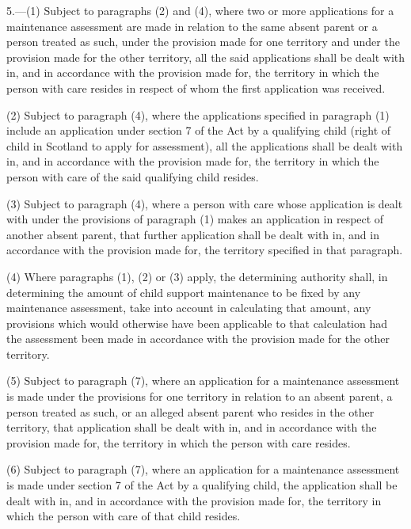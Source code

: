 \documentclass[12pt,a4paper]{article}
\begin{document}
\renewcommand\parthead{--- Schedule 1 Part II}

5.—(1) Subject to paragraphs (2) and (4), where two or more applications for a maintenance assessment are made in relation to the same absent parent or a person treated as such, under the provision made for one territory and under the provision made for the other territory, all the said applications shall be dealt with in, and in accordance with the provision made for, the territory in which the person with care resides in respect of whom the first application was received.

(2) Subject to paragraph (4), where the applications specified in paragraph (1) include an application under section 7 of the Act by a qualifying child (right of child in Scotland to apply for assessment), all the applications shall be dealt with in, and in accordance with the provision made for, the territory in which the person with care of the said qualifying child resides.

(3) Subject to paragraph (4), where a person with care whose application is dealt with under the provisions of paragraph (1) makes an application in respect of another absent parent, that further application shall be dealt with in, and in accordance with the provision made for, the territory specified in that paragraph.

(4) Where paragraphs (1), (2) or (3) apply, the determining authority shall, in determining the amount of child support maintenance to be fixed by any maintenance assessment, take into account in calculating that amount, any provisions which would otherwise have been applicable to that calculation had the assessment been made in accordance with the provision made for the other territory.

(5) Subject to paragraph (7), where an application for a maintenance assessment is made under the provisions for one territory in relation to an absent parent, a person treated as such, or an alleged absent parent who resides in the other territory, that application shall be dealt with in, and in accordance with the provision made for, the territory in which the person with care resides.

(6) Subject to paragraph (7), where an application for a maintenance assessment is made under section 7 of the Act by a qualifying child, the application shall be dealt with in, and in accordance with the provision made for, the territory in which the person with care of that child resides.
\end{document}
